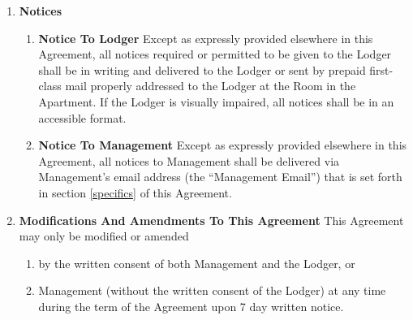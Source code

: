 \documentclass[12pt,letterpaper]{article}
\newcommand{\lodger}{Lodger}
\newcommand{\management}{Management}
\newcommand{\myemail}{Management Email}
\newcommand{\apt}{Apartment}
\newcommand{\room}{Room}
\begin{document}
\begin{enumerate}
\begin{enumerate}
			\item \textbf{Service Of Termination Notice} \label{service}
				\quad When a notice of termination requires service pursuant to California Code of Civil Procedure 1162, such service may be made by either: 
				\begin{enumerate}
					\item Personally delivering a copy to the \lodger{}; or, 
					\item If the \lodger{} is absent from the \room{} and from their usual place of business, service may be made by leaving a copy with some person of suitable age and discretion at their usual place of business, and sending a copy through the mail addressed to the \lodger{} at \apt{}; or, 
					\item If such place of business cannot be ascertained, or a person of suitable age or discretion there cannot be found, then service may be made by affixing a copy in a conspicuous place in the \room{}, and also sending a copy through the mail addressed to the \lodger{} at \apt{}.
				\end{enumerate}
		\end{enumerate}
	\item \textbf{Notices} \quad 
		\begin{enumerate} 
			\item \textbf{Notice To \lodger{}} \quad 
				Except as expressly provided elsewhere in this Agreement, all notices required or permitted to be given to the \lodger{} shall be in writing and delivered to the \lodger{} or sent by prepaid first-class mail properly addressed to the \lodger{} at the \room{} in the \apt{}. If the \lodger{} is visually impaired, all notices shall be in an accessible format. 
			\item \textbf{Notice To Management} \quad 
				Except as expressly provided elsewhere in this Agreement, all notices to \management{} shall be delivered via \management{}'s email address (the ``\myemail{}'') that is set forth in section \ref{specifics} of this Agreement{}.
		\end{enumerate}
	\item \textbf{Modifications And Amendments To This Agreement} \label{modifications}
		\quad This Agreement may only be modified or amended 
		\begin{enumerate}
			\item by the written consent of both \management{} and the \lodger{}, or 
			\item \management{} (without the written consent of the \lodger{}) at any time during the term of the Agreement upon 7 day written notice. 
		\end{enumerate}
				

\end{enumerate}
\end{document}
